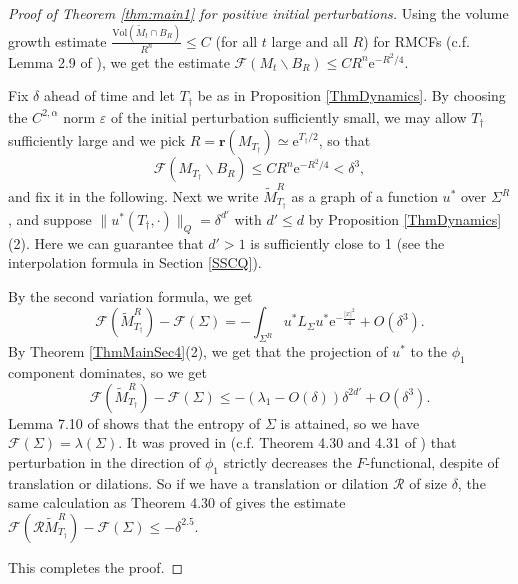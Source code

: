 \documentclass[12pt]{amsart}
\numberwithin{equation}{section}
\numberwithin{equation}{section}
\newcommand{\eps}{\varepsilon}
\newcommand{\dt}{\delta}
\newcommand{\al}{\alpha}
\newcommand{\cF}{\mathcal{F}}
\begin{document}
	
	\begin{proof}[Proof of Theorem \ref{thm:main1} for positive initial perturbations] Using the volume growth estimate $\frac{\mathrm{Vol}(\widetilde M_t\cap B_R)}{R^n}\leq C$ (for all $t$ large and all $R$) for RMCFs (c.f. Lemma 2.9 of \cite{CM1}), we get the estimate $\cF(M_t\backslash B_R)\leq CR^n \mathrm{e}^{-R^2/4}$. 
		
		Fix $\dt$ ahead of time and let   $T_\dagger$ be as in Proposition \ref{ThmDynamics}. By choosing the $C^{2,\al}$ norm $\eps$ of the initial perturbation sufficiently small, we may allow $T_\dagger$ sufficiently large and we pick $R=\mathbf r(M_{T_\dagger})\simeq \mathrm{e}^{T_\dagger/2}$, so that $$\cF(M_{T_\dagger}\backslash B_R)\leq CR^n \mathrm{e}^{-R^2/4}<\dt^{3},$$  and fix it in the following. Next we write $\widetilde M_{T_\dagger}^R$ as a graph of a function $u^*$ over $\Sigma^R$, and suppose $\|u^*(T_\dagger,\cdot )\|_{Q}=\dt^{d'}$ with $d'\leq d$ by Proposition \ref{ThmDynamics}(2). Here we can guarantee that $d'>1$ is sufficiently close to 1 (see the interpolation formula in Section \ref{SSCQ}). 
		
		By the second variation formula, we get 
		\begin{equation}\label{Eq2ndVariation}\cF(\widetilde M_{T_\dagger}^R)-\cF(\Sigma)=-\int_{\Sigma^R} u^* L_\Sigma  u^* \mathrm{e}^{-\frac{|x|^2}{4}}+O(\dt^{3}).\end{equation}
		By Theorem \ref{ThmMainSec4}(2), we get that the projection of $u^*$ to the $\phi_1$ component dominates, so we get 
		$$\cF(\widetilde M_{T_\dagger}^R)-\cF(\Sigma)\leq -(\lambda_1-O(\dt))\dt^{2d'}+O(\dt^3).$$
		Lemma 7.10 of \cite{CM1} shows that the entropy of $\Sigma$ is attained, so we have $\cF(\Sigma)=\lambda(\Sigma)$. 
		It was proved in \cite{CM1} (c.f. Theorem 4.30 and 4.31 of \cite{CM1}) that perturbation in the direction of $\phi_1$ strictly decreases the $F$-functional, despite of translation or dilations. So if we have a translation or dilation $\mathcal R$ of size $\dt$, the same calculation as Theorem 4.30 of \cite{CM1} gives the estimate $\cF(\mathcal R\widetilde M_{T_\dagger}^R)-\cF(\Sigma)\leq -\dt^{2.5}$. 
		
		This completes the proof. 
		
	\end{proof}
	
\end{document}
